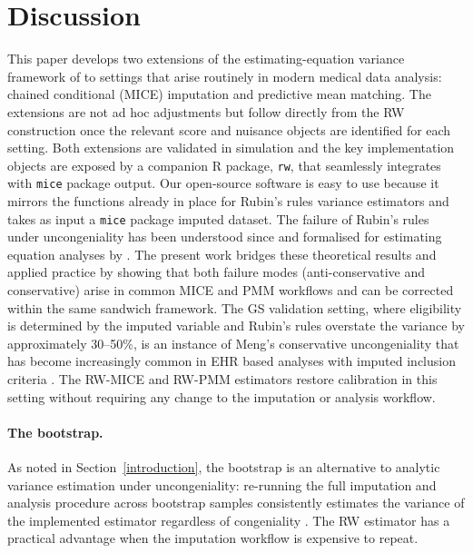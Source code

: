 \section{Discussion}\label{discussion}
This paper develops two extensions of the estimating-equation variance
framework of \citet{robins2000inference} to settings that arise
routinely in modern medical data
analysis: chained conditional (MICE) imputation and predictive mean
matching.  The extensions are not ad hoc adjustments but follow directly
from the RW construction once the relevant score and nuisance objects are
identified for each setting.  Both extensions are validated in simulation
and the key implementation objects are exposed by a companion \textsf{R}
package, \texttt{rw}, that seamlessly integrates with \texttt{mice}
package output.  Our open-source software is easy to use because it
mirrors the functions already in place for Rubin's rules variance
estimators and takes as input a \texttt{mice} package imputed dataset.
The failure of Rubin's rules under uncongeniality has been understood
since \citet{meng1994multiple} and formalised for estimating equation
analyses by \citet{wang1998large}.  The present work bridges these
theoretical results and applied practice by showing that both failure
modes (anti-conservative and conservative) arise in common MICE
and PMM workflows and can be corrected within the same sandwich
framework.  The GS validation setting, where eligibility is determined
by the imputed variable and Rubin's rules overstate the variance by
approximately 30--50\%, is an instance of Meng's conservative
uncongeniality that has become increasingly common in EHR based analyses
with imputed inclusion criteria \citep{shen2026missingness}.  The
RW-MICE and RW-PMM estimators restore calibration in this setting
without requiring any change to the imputation or analysis workflow.
\paragraph{The bootstrap.}
As noted in Section~\ref{introduction}, the bootstrap is an alternative
to analytic variance estimation under uncongeniality: re-running the
full imputation and analysis procedure across bootstrap samples
consistently estimates the variance of the implemented estimator
regardless of congeniality
\citep{schomaker2018bootstrap, bartlett2020bootstrap}.  The RW estimator
has a practical advantage when the imputation workflow is expensive to
repeat.
